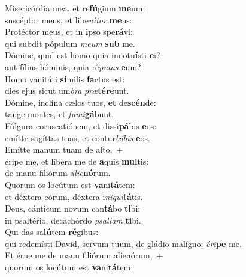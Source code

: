 \evenverse Misericórdia mea, et re\textbf{fú}gium \textbf{me}um:~\*\\
\evenverse suscéptor meus, et libe\textit{rá}\textit{tor} \textbf{me}us:\\
\oddverse Protéctor meus, et in \textbf{i}pso spe\textbf{rá}vi:~\*\\
\oddverse qui subdit pópulum \textit{me}\textit{um} \textbf{sub} me.\\
\evenverse Dómine, quid est homo quia innotu\textbf{í}sti \textbf{e}i?~\*\\
\evenverse aut fílius hóminis, quia ré\textit{pu}\textit{tas} \textbf{e}um?\\
\oddverse Homo vanitáti \textbf{sí}milis \textbf{fa}ctus est:~\*\\
\oddverse dies ejus sicut um\textit{bra} \textit{præ}\textbf{té}\textbf{re}unt.\\
\evenverse Dómine, inclína cælos tuos, \textbf{et} de\textbf{scén}de:~\*\\
\evenverse tange montes, et \textit{fu}\textit{mi}\textbf{gá}bunt.\\
\oddverse Fúlgura coruscatiónem, et dissi\textbf{pá}bis \textbf{e}os:~\*\\
\oddverse emítte sagíttas tuas, et contur\textit{bá}\textit{bis} \textbf{e}os.\\
\evenverse Emítte manum tuam de alto,~+\\
\evenverse  éripe me, et líbera me de \textbf{a}quis \textbf{mul}tis:~\*\\
\evenverse de manu filiórum a\textit{li}\textit{e}\textbf{nó}rum.\\
\oddverse Quorum os locútum est \textbf{va}ni\textbf{tá}tem:~\*\\
\oddverse et déxtera eórum, déxtera i\textit{ni}\textit{qui}\textbf{tá}tis.\\
\evenverse Deus, cánticum novum can\textbf{tá}bo \textbf{ti}bi:~\*\\
\evenverse in psaltério, decachórdo \textit{psal}\textit{lam} \textbf{ti}bi.\\
\oddverse Qui das sa\textbf{lú}tem \textbf{ré}gibus:~\*\\
\oddverse qui redemísti David, servum tuum, de gládio malígno: \textit{é}\textit{ri}\textbf{pe} me.\\
\evenverse Et érue me de manu filiórum alienórum,~+\\
\evenverse  quorum os locútum est \textbf{va}ni\textbf{tá}tem:~\*\\
